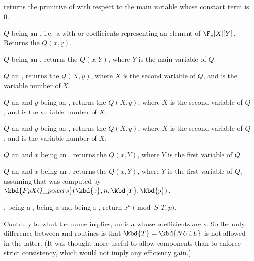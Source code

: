  returns the primitive of  with
respect to the main variable whose constant term is $0$.

 $Q$ being an ,
i.e.~a  with  or  coefficients representing an
element of $\F_p[X][Y]$. Returns the  $Q(x,y)$.

 $Q$ being an , returns the
 $Q(x,Y)$, where $Y$ is the main variable of $Q$.

 $Q$ an , returns
the  $Q(X,y)$, where $X$ is the second variable of $Q$, and 
is the variable number of $X$.

 $Q$ an 
and $y$ being an , returns the  $Q(X,y)$, where $X$ is the
second variable of $Q$, and  is the variable number of $X$.

 $Q$ an 
and $y$ being an , returns the  $Q(X,y)$, where $X$ is the
second variable of $Q$, and  is the variable number of $X$.

 $Q$ an  and
$x$ being an , returns the  $Q(x,Y)$, where $Y$ is the
first variable of $Q$.

 $Q$ an  and
$x$ being an , returns the  $Q(x,Y)$, where $Y$ is the
first variable of $Q$, assuming that  was computed by
$\kbd{FpXQ\_powers}(\kbd{x}, n, \kbd{T}, \kbd{p})$.

,  being a
,  being a  and  being a ,
return $x^n \pmod{S,T,p}$.

Contrary to what the name implies, an  is a  whose
coefficients are s. So the only difference between  and
 routines is that $\kbd{T} = \kbd{NULL}$ is not allowed in the
latter. (It was thought more useful to allow  components than to
enforce strict consistency, which would not imply any efficiency gain.)



